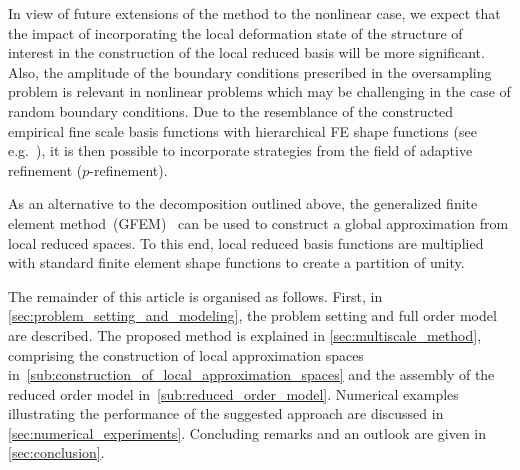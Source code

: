 \documentclass[AMA,STIX1COL,doublespace]{WileyNJD-v2}
\begin{document}
In view of future extensions of the method to the nonlinear case, we expect that the impact of incorporating the local deformation state of the structure of interest in the construction of the local reduced basis will be more significant. Also, the amplitude of the boundary conditions prescribed in the oversampling problem is relevant in nonlinear problems which may be challenging in the case of random boundary conditions.
Due to the resemblance of the constructed empirical fine scale basis functions with hierarchical FE shape functions (see e.g.~\cite{ZienkiewiczTaylor2000}), it is then possible to incorporate strategies from the field of adaptive refinement ($p$-refinement).

As an alternative to the decomposition outlined above, the generalized finite element method~(GFEM)~\cite{BabuskaGalozOsborn1994,BabuskaMelenk1997,BabuskaBanerjeeOsborn2004} can be used to construct a global approximation from local reduced spaces.
To this end, local reduced basis functions are multiplied with standard finite element shape functions to create a partition of unity.

The remainder of this article is organised as follows.
First, in \cref{sec:problem_setting_and_modeling}, the problem setting and full order model are described. 
The proposed method is explained in \cref{sec:multiscale_method}, comprising the construction of local approximation spaces in~\cref{sub:construction_of_local_approximation_spaces} and the assembly of the reduced order model in~\cref{sub:reduced_order_model}.
Numerical examples illustrating the performance of the suggested approach are discussed in \cref{sec:numerical_experiments}.
Concluding remarks and an outlook are given in \cref{sec:conclusion}.
\end{document}
